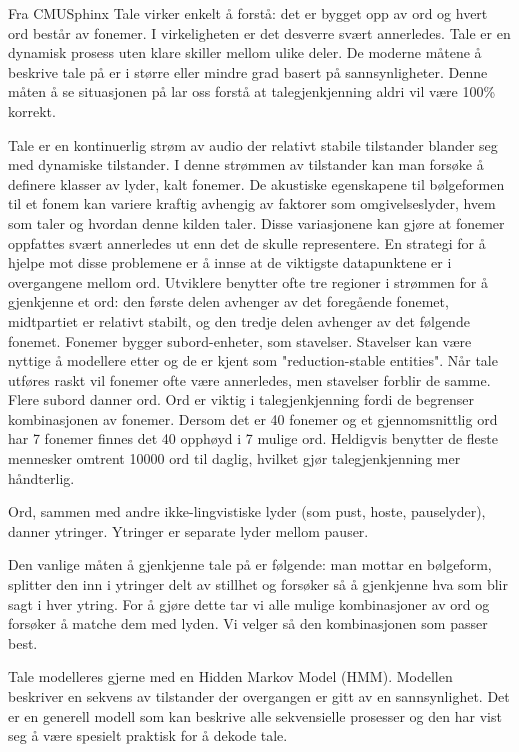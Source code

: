 {{Fra CMUSphinx
Tale virker enkelt å forstå: det er bygget opp av ord og hvert ord består av fonemer. I virkeligheten er det desverre svært annerledes. Tale er en dynamisk prosess uten klare skiller mellom ulike deler. De moderne måtene å beskrive tale på er i større eller mindre grad basert på sannsynligheter. Denne måten å se situasjonen på lar oss forstå at talegjenkjenning aldri vil være 100\% korrekt.

Tale er en kontinuerlig strøm av audio der relativt stabile tilstander blander seg med dynamiske tilstander. I denne strømmen av tilstander kan man forsøke å definere klasser av lyder, kalt fonemer. De akustiske egenskapene til bølgeformen til et fonem kan variere kraftig avhengig av faktorer som omgivelseslyder, hvem som taler og hvordan denne kilden taler. Disse variasjonene kan gjøre at fonemer oppfattes svært annerledes ut enn det de skulle representere. 
En strategi for å hjelpe mot disse problemene er å innse at de viktigste datapunktene er i overgangene mellom ord. Utviklere benytter ofte tre regioner i strømmen for å gjenkjenne et ord: den første delen avhenger av det foregående fonemet, midtpartiet er relativt stabilt, og den tredje delen avhenger av det følgende fonemet. Fonemer bygger subord-enheter, som stavelser. Stavelser kan være nyttige å modellere etter og de er kjent som "reduction-stable entities". Når tale utføres raskt vil fonemer ofte være annerledes, men stavelser forblir de samme. Flere subord danner ord. Ord er viktig i talegjenkjenning fordi de begrenser kombinasjonen av fonemer. Dersom det er 40 fonemer og et gjennomsnittlig ord har 7 fonemer finnes det 40 opphøyd i 7 mulige ord. Heldigvis benytter de fleste mennesker omtrent 10000 ord til daglig, hvilket gjør talegjenkjenning mer håndterlig.

Ord, sammen med andre ikke-lingvistiske lyder (som pust, hoste, pauselyder), danner ytringer. Ytringer er separate lyder mellom pauser. 

Den vanlige måten å gjenkjenne tale på er følgende: man mottar en bølgeform, splitter den inn i ytringer delt av stillhet og forsøker så å gjenkjenne hva som blir sagt i hver ytring. For å gjøre dette tar vi alle mulige kombinasjoner av ord og forsøker å matche dem med lyden. Vi velger så den kombinasjonen som passer best.

Tale modelleres gjerne med en Hidden Markov Model (HMM). Modellen beskriver en sekvens av tilstander der overgangen er gitt av en sannsynlighet. Det er en generell modell som kan beskrive alle sekvensielle prosesser og den har vist seg å være spesielt praktisk for å dekode tale.

}}
